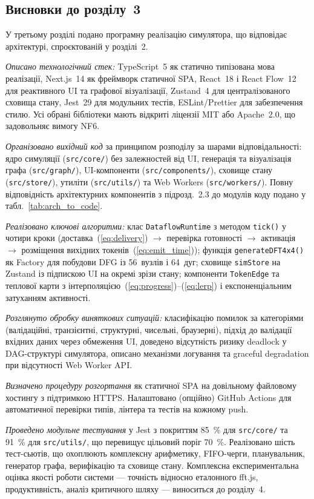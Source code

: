 \subsection*{Висновки до розділу~3}

У третьому розділі подано програмну реалізацію симулятора, що
відповідає архітектурі, спроєктованій у розділі~2.

\emph{Описано технологічний стек:} TypeScript~5 як статично
типізована мова реалізації, Next.js~14 як фреймворк статичної SPA,
React~18 і React Flow~12 для реактивного UI та графової
візуалізації, Zustand~4 для централізованого сховища стану,
Jest~29 для модульних тестів, ESLint/Prettier для забезпечення
стилю. Усі обрані бібліотеки мають відкриті ліцензії MIT або
Apache~2.0, що задовольняє вимогу NF6.

\emph{Організовано вихідний код} за принципом розподілу за шарами
відповідальності: ядро симуляції (\texttt{src/core/}) без
залежностей від UI, генерація та візуалізація графа
(\texttt{src/graph/}), UI-компоненти (\texttt{src/components/}),
сховище стану (\texttt{src/store/}), утиліти (\texttt{src/utils/})
та Web Workers (\texttt{src/workers/}). Повну відповідність
архітектурних компонентів з підрозд.~2.3 до модулів коду подано
у табл.~\ref{tab:arch_to_code}.

\emph{Реалізовано ключові алгоритми:} клас \texttt{DataflowRuntime}
з методом \texttt{tick()} у чотири кроки
(доставка~(\ref{eq:delivery}) $\to$ перевірка готовності $\to$
активація $\to$ розміщення вихідних токенів~(\ref{eq:emit_time}));
функція \texttt{generateDFT4x4()} як Factory для побудови DFG із
56~вузлів і 64~дуг; сховище \texttt{simStore} на Zustand із
підпискою UI на окремі зрізи стану; компоненти \texttt{TokenEdge}
та теплової карти з інтерполяцією~(\ref{eq:progress})--(\ref{eq:lerp})
і експоненціальним затуханням активності.

\emph{Розглянуто обробку виняткових ситуацій:} класифікацію помилок
за категоріями (валідаційні, транзієнтні, структурні, чисельні,
браузерні), підхід до валідації вхідних даних через обмеження UI,
доведено відсутність ризику deadlock у DAG-структурі симулятора,
описано механізми логування та graceful degradation при
відсутності Web Worker API.

\emph{Визначено процедуру розгортання} як статичної SPA на довільному
файловому хостингу з підтримкою HTTPS. Налаштовано (опційно)
GitHub Actions для автоматичної перевірки типів, лінтера та тестів
на кожному push.

\emph{Проведено модульне тестування} у Jest з покриттям 85~\% для
\texttt{src/core/} та 91~\% для \texttt{src/utils/}, що перевищує
цільовий поріг 70~\%. Реалізовано шість тест-сьютів, що охоплюють
комплексну арифметику, FIFO-черги, планувальник, генератор графа,
верифікацію та сховище стану. Комплексна експериментальна оцінка
якості роботи системи --- точність відносно еталонного fft.js,
продуктивність, аналіз критичного шляху --- виноситься до розділу~4.